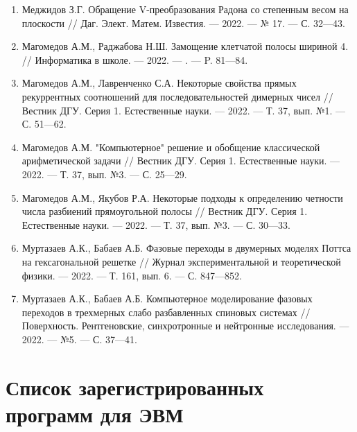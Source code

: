 \begin{enumerate}[1]
    \item
    Меджидов З.Г.
    Обращение V-преобразования Радона со степенным весом на плоскости
    //
    Даг. Элект. Матем. Известия.
    --- 2022.
    --- № 17.
    --- С. 32---43.


    
    \item
    Магомедов А.М., Раджабова Н.Ш.
    Замощение клетчатой полосы шириной 4.
    //
    Информатика в школе.
    --- 2022.
    --- .
    --- P. 81---84. 
    
    \item
    Магомедов А.М., Лавренченко С.А.
    Некоторые свойства прямых рекуррентных соотношений для последовательностей димерных чисел
    //
    Вестник ДГУ. Серия 1. Естественные науки.
    --- 2022.
    --- Т. 37, вып. №1.
    --- С. 51---62.
    
    \item
    Магомедов А.М.
    "Компьютерное" решение и обобщение классической арифметической задачи
    //
    Вестник ДГУ. Серия 1. Естественные науки.
    --- 2022.
    --- Т. 37, вып. №3.
    --- С. 25---29.
    
    \item
    Магомедов А.М., Якубов Р.А.
    Некоторые подходы к определению четности числа разбиений прямоугольной полосы
    //
    Вестник ДГУ. Серия 1. Естественные науки.
    --- 2022.
    --- Т. 37, вып. №3.
    --- С. 30---33.


    
    \item
    Муртазаев А.К., Бабаев А.Б.
    Фазовые переходы в двумерных моделях Поттса на гексагональной решетке
    //
    Журнал экспериментальной и теоретической физики.
    --- 2022.
    --- Т. 161, вып. 6.
    --- С. 847---852.
    
    \item
    Муртазаев А.К., Бабаев А.Б.
    Компьютерное моделирование фазовых переходов в трехмерных слабо разбавленных спиновых системах
    //
    Поверхность. Рентгеновские, синхротронные и нейтронные исследования.
    --- 2022.
    --- №5.
    --- С. 37---41. 

\end{enumerate}

\section*{Список зарегистрированных программ для ЭВМ}

